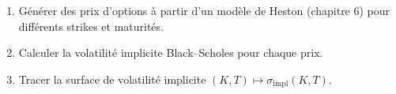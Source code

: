 \begin{exercice}
\begin{enumerate}
    \item G\'en\'erer des prix d'options \`a partir d'un mod\`ele de Heston
          (chapitre 6) pour diff\'erents strikes et maturit\'es.
    \item Calculer la volatilit\'e implicite Black--Scholes pour chaque prix.
    \item Tracer la surface de volatilit\'e implicite $(K, T) \mapsto
          \sigma_{\text{impl}}(K,T)$.
\end{enumerate}
\end{exercice}

